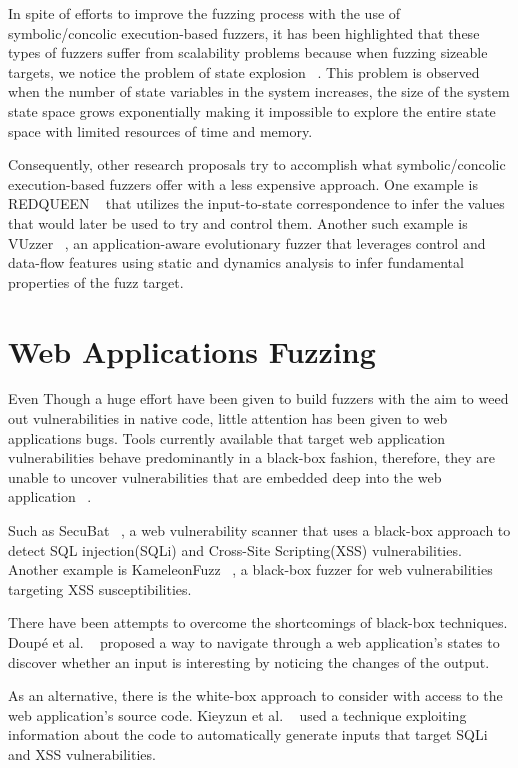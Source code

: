 In spite of efforts to improve the fuzzing process with the use of symbolic/concolic execution-based fuzzers, it has been highlighted that these types of fuzzers suffer from scalability problems because when fuzzing sizeable targets, we notice the problem of state explosion ~\cite{Clarke2012}. This problem is observed when the number of state variables in the system increases, the size of the system state space grows exponentially making it impossible to explore the entire state space with limited resources of time and memory.

Consequently, other research proposals try to accomplish what symbolic/concolic execution-based fuzzers offer with a less expensive approach. One example is REDQUEEN ~\cite{aschermann2019redqueen} that utilizes the input-to-state correspondence to infer the values that would later be used to try and control them. Another such example is VUzzer ~\cite{rawat2017vuzzer}, an application-aware evolutionary fuzzer that leverages control and data-flow features using static and dynamics analysis to infer fundamental properties of the fuzz target.

\section{Web Applications Fuzzing}
Even Though a huge effort have been given to build fuzzers with the aim to weed out vulnerabilities in native code, little attention has been given to web applications bugs. Tools currently available that target web application vulnerabilities behave predominantly in a black-box fashion, therefore, they are unable to uncover vulnerabilities that are embedded deep into the web application ~\cite{bau2010state, doupe2010johnny}.
 
Such as SecuBat ~\cite{kals2006secubat}, a web vulnerability scanner that uses a black-box approach to detect SQL injection(SQLi) and Cross-Site Scripting(XSS) vulnerabilities. Another example is KameleonFuzz ~\cite{duchene2014kameleonfuzz}, a black-box fuzzer for web vulnerabilities targeting XSS susceptibilities.

There have been attempts to overcome the shortcomings of black-box techniques. Doupé et al. ~\cite{doupe2012enemy} proposed a way to navigate through a web application's states to discover whether an input is interesting by noticing the changes of the output. 

As an alternative, there is the white-box approach to consider with access to the web application's source code. Kieyzun et al. ~\cite{kieyzun2009automatic} used a technique exploiting information about the code to automatically generate inputs that target SQLi and XSS vulnerabilities. 

